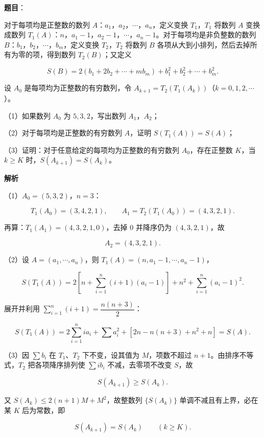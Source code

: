 \begin{answer}

\textbf{题目}：

对于每项均是正整数的数列 $A$：$a_1$，$a_2$，$\cdots$，$a_n$，定义变换 $T_1$，$T_1$ 将数列 $A$ 变换成数列 $T_1(A)$：$n$，$a_1-1$，$a_2-1$，$\cdots$，$a_n-1$。对于每项均是非负整数的数列 $B$：$b_1$，$b_2$，$\cdots$，$b_m$，定义变换 $T_2$，$T_2$ 将数列 $B$ 各项从大到小排列，然后去掉所有为零的项，得到数列 $T_2(B)$；又定义

\nopagebreak[4]
\[S(B)=2(b_1+2b_2+\cdots+mb_m)+b_1^2+b_2^2+\cdots+b_m^2.\]

设 $A_0$ 是每项均为正整数的有穷数列，令 $A_{k+1}=T_2(T_1(A_k))$（$k=0,1,2,\cdots$）。

（1）如果数列 $A_0$ 为 $5,3,2$，写出数列 $A_1$，$A_2$；

（2）对于每项均是正整数的有穷数列 $A$，证明 $S(T_1(A))=S(A)$；

（3）证明：对于任意给定的每项均为正整数的有穷数列 $A_0$，存在正整数 $K$，当 $k\geqslant K$ 时，$S(A_{k+1})=S(A_k)$。

\textbf{解析}

（1）$A_0=(5,3,2)$，$n=3$：

\nopagebreak[4]
\[T_1(A_0)=(3,4,2,1),\qquad A_1=T_2(T_1(A_0))=(4,3,2,1).\]

再算：$T_1(A_1)=(4,3,2,1,0)$，去掉 $0$ 并降序仍为 $(4,3,2,1)$，故

\nopagebreak[4]
\[A_2=(4,3,2,1).\]

（2）设 $A=(a_1,\cdots,a_n)$，则 $T_1(A)=(n,a_1-1,\cdots,a_n-1)$，

\nopagebreak[4]
\[S(T_1(A))=2\left[n+\sum_{i=1}^n(i+1)(a_i-1)\right]+n^2+\sum_{i=1}^n(a_i-1)^2.\]

展开并利用 $\sum\limits_{i=1}^n(i+1)=\dfrac{n(n+3)}2$：

\nopagebreak[4]
\[S(T_1(A))=2\sum_{i=1}^nia_i+\sum a_i^2+\left[2n-n(n+3)+n^2+n\right]=S(A).\]

（3）因 $\sum b_i$ 在 $T_1$、$T_2$ 下不变，设其值为 $M$，项数不超过 $n+1$。由排序不等式，$T_2$ 把各项降序排列使 $\sum ib_i$ 不减，去零项不改变 $S$，故

\nopagebreak[4]
\[S(A_{k+1})\geqslant S(A_k).\]

又 $S(A_k)\leqslant 2(n+1)M+M^2$，故整数列 $\{S(A_k)\}$ 单调不减且有上界，必在某 $K$ 后为常数，即

\nopagebreak[4]
\[S(A_{k+1})=S(A_k)\qquad(k\geqslant K).\]


\end{answer}